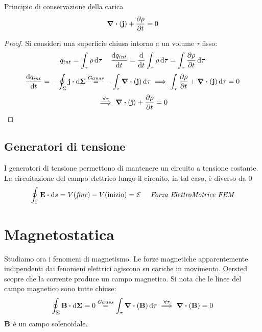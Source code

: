 \documentclass[12pt,a4paper]{article}
\begin{document}
\begin{theorem}
    Principio di conservazione della carica
    \begin{equation*}
        \div(\vb{j})+\pdv{\rho}{t}=0
    \end{equation*}
\end{theorem}
\begin{proof}
    Si consideri una superficie chiusa intorno a un volume $\tau$ fisso:
    \begin{equation*}
        q_{int}= \int_\tau\rho\dd{\tau} \quad \dv{q_{int}}{t}= \dv{}{t}\int_\tau \rho\dd{\tau} = \int_\tau \pdv{\rho}{t}\dd{\tau}
    \end{equation*}
    \begin{equation*}
        \dv{q_{int}}{t}= - \oint_\Sigma \vb{j}\vdot\dd{\vb{\Sigma}}\overset{Gauss}{=}-\int_\tau \div(\vb{j})\dd{\tau}\implies
        \int_\tau \pdv{\rho}{t} + \div(\vb{j}) \dd{\tau}= 0
    \end{equation*}
    \begin{equation*}
        \overset{\forall\tau}{\implies} \div(\vb{j})+ \pdv{\rho}{t}=0
    \end{equation*}

\end{proof}


\subsection{Generatori di tensione}
I generatori di tensione permettono di mantenere un circuito a tensione costante.
La circuitazione del campo elettrico lungo il circuito, in tal caso, è diverso da 0
\begin{equation*}
    \oint_\Gamma \vb{E}\vdot\dd{s}= V(\textit{fine})-V(\text{inizio}) = \mathcal{E}\quad \textit{      Forza ElettroMotrice FEM}
\end{equation*} 



\section{Magnetostatica}
Studiamo ora i fenomeni di magnetismo. Le forze magnetiche apparentemente indipendenti dai fenomeni elettrici agiscono su cariche in movimento.
Oersted scopre che la corrente produce un campo magnetico.
Si nota che le linee del campo magnetico sono tutte chiuse:
\begin{equation*}
    \oint_\Sigma \vb{B}\vdot\dd{\vb{\Sigma}} = 0 \overset{Gauss}{=} \int_\tau \div(\vb{B}) \dd{\tau} \overset{\forall \tau}{\implies} \div(\vb{B})= 0
\end{equation*}
$\vb{B}$ è un campo solenoidale.
\end{document}
